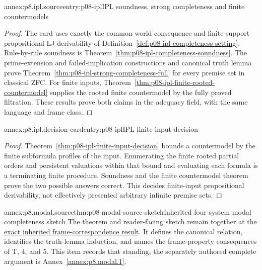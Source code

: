 
\begin{annexitem}{annex:p8.ipl.source}{entry:p08-ipl}{IPL soundness, strong completeness and finite countermodels}
\begin{proof}
The card uses exactly the common-world consequence and finite-support
propositional LJ derivability of
Definition~\ref{def:p08-ipl-completeness-setting}. Rule-by-rule soundness is
Theorem~\ref{thm:p08-ipl-completeness-soundness}. The prime-extension and
failed-implication constructions and canonical truth lemma prove
Theorem~\ref{thm:p08-ipl-strong-completeness-full} for every premise set in
classical ZFC. For finite inputs,
Theorem~\ref{thm:p08-ipl-finite-rooted-countermodel} supplies the rooted finite
countermodel by the fully proved filtration. These results prove both claims
in the adequacy field, with the same language and frame class.
\end{proof}
\end{annexitem}

\begin{annexitem}{annex:p8.ipl.decision-card}{entry:p08-ipl}{IPL finite-input decision}
\begin{proof}
Theorem~\ref{thm:p08-ipl-finite-input-decision} bounds a countermodel by the
finite subformula profiles of the input. Enumerating the finite rooted
partial orders and persistent valuations within that bound and evaluating
each formula is a terminating finite procedure. Soundness and the finite
countermodel theorem prove the two possible answers correct. This decides
finite-input propositional derivability, not effectively presented arbitrary
infinite premise sets.
\end{proof}
\end{annexitem}

\begin{annexitem}{annex:p8.modal.source}{thm:p08-modal-source-sketch}{Inherited four-system modal completeness sketch}
The theorem and reader-facing sketch remain together at
\hyperref[thm:p08-source-modal-four-adequacy]{the exact inherited
frame-correspondence result}.  It defines the canonical relation, identifies
the truth-lemma induction, and names the frame-property consequences of T, 4,
and 5.  This item records that standing; the separately authored complete
argument is Annex~\ref{annex:p8.modal.1}.
\end{annexitem}

